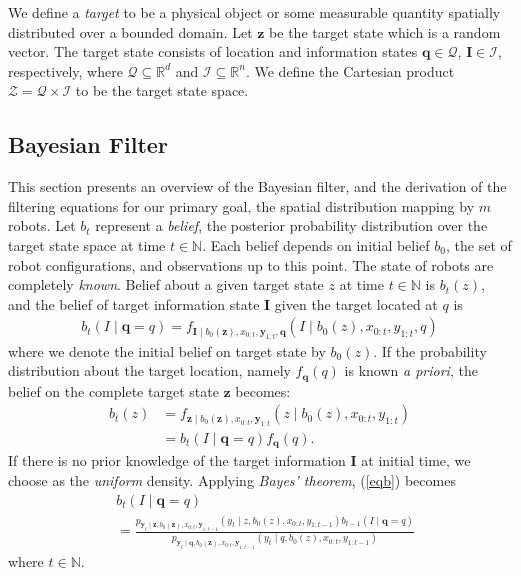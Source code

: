 \documentclass[journal]{IEEEtran}
\begin{document}
We define a \emph{target} to be a physical object or some measurable quantity spatially distributed over a bounded domain.
Let $\bm{z}$ be the target state which is a random vector. The target state consists of location and information states $\bm{q} \in \mathcal{Q}$, $\bm{I} \in \mathcal{I}$, respectively, where $\mathcal{Q} \subseteq \mathbb{R}^d$ and $\mathcal{I} \subseteq \mathbb{R}^n$. We define the Cartesian product $\mathcal{Z} = \mathcal{Q} \times \mathcal{I}$ to be the target state space. 




\subsection{Bayesian Filter}
This section presents an overview of the Bayesian filter, and the derivation of the filtering equations for our primary goal, the spatial distribution mapping by $m$ robots.
Let $b_t$ represent a \emph{belief}, the posterior
probability distribution over the target state space at time $t \in \mathbb{N}$. Each belief depends on initial belief $b_0$, the set of robot configurations, and observations up to this point.
The state of robots are completely \emph{known}.
Belief about a given target state $z$ at time $t \in \mathbb{N}$ is $b_t(z)$, and the belief of target information state $\bm{I}$ given the target located at $q$ is
\begin{align}
b_t(I \mid \bm{q} = q)= f_{\bm{I}\mid b_0(\bm{z}),{x}_{0:t},\bm{y}_{1:t},\bm{q}}
\left(
I \mid b_0(z),
{x}_{0:t},y_{1:t},q
\right)
\label{eqb}
\end{align}
where we denote the initial belief on target state by $b_0(z)$.
If the probability distribution about the target location, namely $f_{\bm{q}}(q)$ is known \emph{a priori}, the belief on the complete target state $\bm{z}$ becomes:
\begin{align}
b_t(z)&=
f_{\bm{z} \mid b_0(\bm{z}),{x}_{0:t},\bm{y}_{1:t}}
\left(
z \mid b_0(z),
{x}_{0:t},y_{1:t}
\right) \nonumber  \\
&=
b_t(I\mid \bm{q}=q)f_{\bm{q}}(q). 
\label{eq0}
\end{align}
If there is no prior knowledge of the target information $\bm{I}$ at initial time, we
choose as the \emph{uniform} density. 
Applying \emph{Bayes' theorem}, (\ref{eqb}) becomes
{\small{
\begin{align*}
&b_{t}(I \mid \bm{q} =q)\\
&=
\frac{
	p_{\bm{y}_{t} \mid
\bm{z},b_0(\bm{z}),
{x}_{0:t},\bm{y}_{1:t-1}	
}\left(
	y_{t} \mid
	z,b_0(z),
	{x}_{0:t},y_{1:t-1}
\right)
b_{t-1}(I\mid \bm{q} = q)
}
{
	p_{\bm{y}_{t} \mid
		\bm{q},
		b_0(\bm{z}),
		{x}_{0:t},\bm{y}_{1:t-1}	
	}\left(
	y_{t} \mid
	q,b_0(z),
	{x}_{0:t},y_{1:t-1}
	\right)
}
\end{align*}}}where $t \in \mathbb{N}$.
\end{document}

